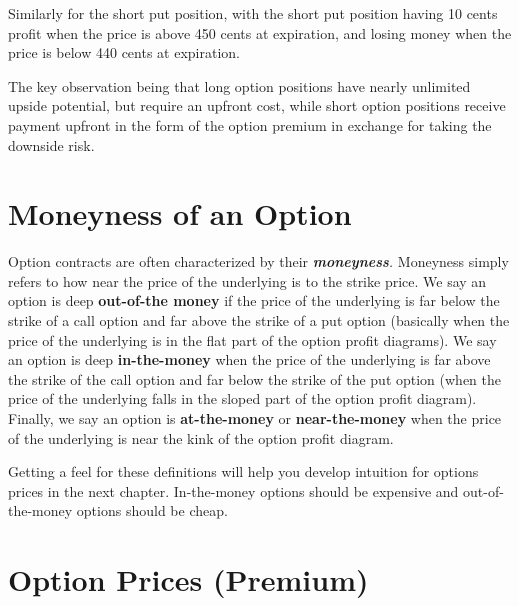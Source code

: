 \documentclass[
]{book}
\begin{document}
Similarly for the short put position, with the short put position having 10 cents profit when the price is above 450 cents at expiration, and losing money when the price is below 440 cents at expiration.

The key observation being that long option positions have nearly unlimited upside potential, but require an upfront cost, while short option positions receive payment upfront in the form of the option premium in exchange for taking the downside risk.

\hypertarget{moneyness-of-an-option}{%
\section{Moneyness of an Option}\label{moneyness-of-an-option}}

Option contracts are often characterized by their \emph{\textbf{moneyness}.} Moneyness simply refers to how near the price of the underlying is to the strike price. We say an option is deep \textbf{out-of-the money} if the price of the underlying is far below the strike of a call option and far above the strike of a put option (basically when the price of the underlying is in the flat part of the option profit diagrams). We say an option is deep \textbf{in-the-money} when the price of the underlying is far above the strike of the call option and far below the strike of the put option (when the price of the underlying falls in the sloped part of the option profit diagram). Finally, we say an option is \textbf{at-the-money} or \textbf{near-the-money} when the price of the underlying is near the kink of the option profit diagram.

Getting a feel for these definitions will help you develop intuition for options prices in the next chapter. In-the-money options should be expensive and out-of-the-money options should be cheap.

\hypertarget{option-prices-premium}{%
\section{Option Prices (Premium)}\label{option-prices-premium}}
\end{document}
